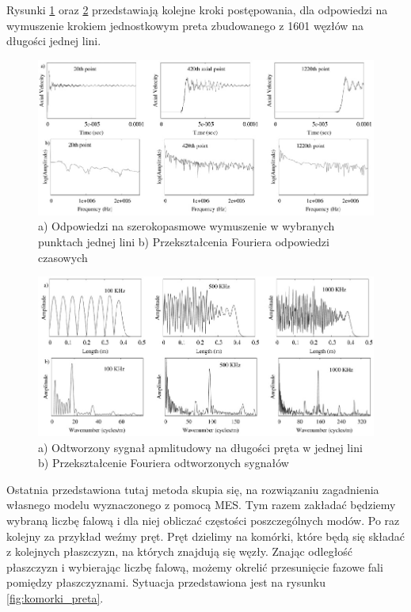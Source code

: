 Rysunki \ref{fig:szer_odp_czasowe} oraz \ref{fig:szer_odp_przestrzenne} przedstawiają kolejne kroki postępowania, dla odpowiedzi na wymuszenie krokiem jednostkowym preta zbudowanego z 1601 węzłów na długości jednej lini. 

\begin{figure}[h]
\centering
\includegraphics[width=12cm]{Zdjecia/2/widmo_wymuszenia_szerokopasmowe1}
\caption{a) Odpowiedzi na szerokopasmowe wymuszenie w wybranych punktach jednej lini b) Przekształcenia Fouriera odpowiedzi czasowych}
\label{fig:szer_odp_czasowe}
\end{figure}

\begin{figure}[h]
\centering
\includegraphics[width=12cm]{Zdjecia/2/widmo_wymuszenia_szerokopasmowe2}
\caption{a) Odtworzony sygnał apmlitudowy na długości pręta w jednej lini b) Przekształcenie Fouriera odtworzonych sygnałów}
\label{fig:szer_odp_przestrzenne}
\end{figure}

Ostatnia przedstawiona tutaj metoda skupia się, na rozwiązaniu zagadnienia własnego modelu wyznaczonego z pomocą MES. Tym razem zakładać będziemy wybraną liczbę falową i dla niej obliczać częstości poszczególnych modów. 
Po raz kolejny za przykład weźmy pręt. Pręt dzielimy na komórki, które będą się składać z kolejnych płaszczyzn, na których znajdują się węzły. Znając odległość płaszczyzn i wybierając liczbę falową, możemy okrelić przesunięcie fazowe fali pomiędzy płaszczyznami. Sytuacja przedstawiona jest na rysunku \ref{fig:komorki_preta}.


